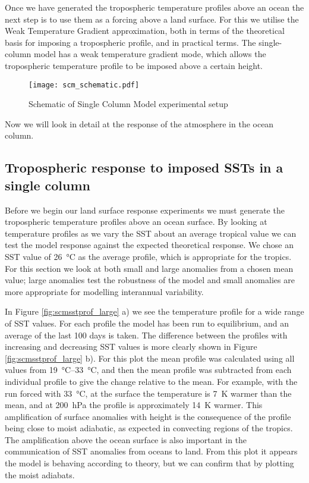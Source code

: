 Once we have generated the tropospheric temperature profiles above an ocean the 
next step is to use them as a forcing above a land surface. For this we utilise 
the Weak Temperature Gradient approximation, both in terms of the theoretical 
basis for imposing a tropospheric profile, and in practical terms. The 
single-column model has a weak temperature gradient mode, which allows the 
tropospheric temperature profile to be imposed above a certain height.


\begin{figure}[ht]
\texttt{[image: scm\_schematic.pdf]}
\caption{Schematic of Single Column Model experimental setup}
\label{fig:scmschem}
\end{figure}

Now we will look in detail at the response of the atmosphere in the ocean 
column.

\subsection{Tropospheric response to imposed SSTs in a single column}
\label{trop_response_ocean}

Before we begin our land surface response experiments we must generate the 
tropospheric temperature profiles above an ocean surface. By looking at 
temperature profiles as we vary the SST about an average tropical value we can 
test the model response against the expected theoretical response. We chose an 
SST value of \SI{26}{\degreeCelsius} as the average profile, which is 
appropriate for the tropics. For this section we look at both small and large 
anomalies from a chosen mean value; large anomalies test the robustness of the 
model and small anomalies are more appropriate for modelling interannual 
variability.

In Figure \ref{fig:scmsstprof_large} a) we see the temperature profile for a 
wide range of SST values. For each profile the model has been run to 
equilibrium, and an average of the last 100 days is taken. The difference 
between the profiles with increasing and decreasing SST values is more clearly 
shown in Figure \ref{fig:scmsstprof_large} b). For this plot the mean profile 
was calculated using all values from \SIrange{19}{33}{\degreeCelsius}, and then 
the mean profile was subtracted from each individual profile to give the change 
relative to the mean. For example, with the run forced with 
\SI{33}{\degreeCelsius}, at the surface the temperature is \SI{7}{\kelvin} 
warmer than the mean, and at \SI{200}{\hecto\pascal} the profile is 
approximately \SI{14}{\kelvin} warmer. This amplification of surface anomalies 
with height is the consequence of the profile being close to moist adiabatic, as 
expected in convecting regions of the tropics. The amplification above the ocean 
surface is also important in the communication of SST anomalies from oceans to 
land. From this plot it appears the model is behaving according to theory, but 
we can confirm that by plotting the moist adiabats.

